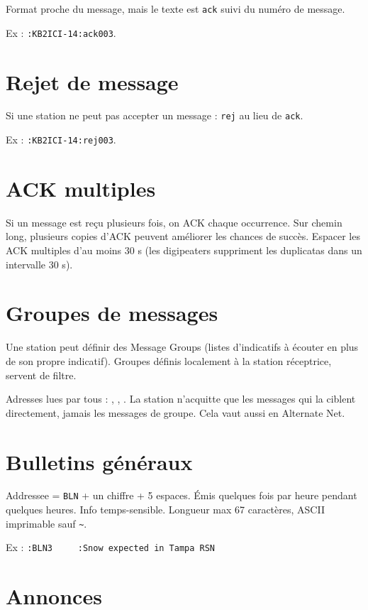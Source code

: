 Format proche du message, mais le texte est \texttt{ack} suivi du numéro
de message.

Ex : \texttt{:KB2ICI-14:ack003}.

\section{Rejet de message}\label{rejet-de-message}

Si une station ne peut pas accepter un message : \texttt{rej} au lieu de
\texttt{ack}.

Ex : \texttt{:KB2ICI-14:rej003}.

\section{ACK multiples}\label{ack-multiples}

Si un message est reçu plusieurs fois, on ACK chaque occurrence. Sur
chemin long, plusieurs copies d'ACK peuvent améliorer les chances de
succès. Espacer les ACK multiples d'au moins 30 s (les digipeaters
suppriment les duplicatas dans un intervalle 30 s).

\section{Groupes de messages}\label{groupes-de-messages}

Une station peut définir des Message Groups (listes d'indicatifs à
écouter en plus de son propre indicatif). Groupes définis localement à
la station réceptrice, servent de filtre.

Adresses lues par tous : , , . La
station n'acquitte que les messages qui la ciblent directement, jamais
les messages de groupe. Cela vaut aussi en Alternate Net.

\section{Bulletins généraux}\label{bulletins-guxe9nuxe9raux}

Addressee = \texttt{BLN} + un chiffre + 5 espaces. Émis quelques fois
par heure pendant quelques heures. Info temps-sensible. Longueur max 67
caractères, ASCII imprimable sauf \texttt{\textbar{}}
\texttt{\textasciitilde{}}.

Ex : \texttt{:BLN3\ \ \ \ \ :Snow\ expected\ in\ Tampa\ RSN}

\section{Annonces}\label{annonces}

